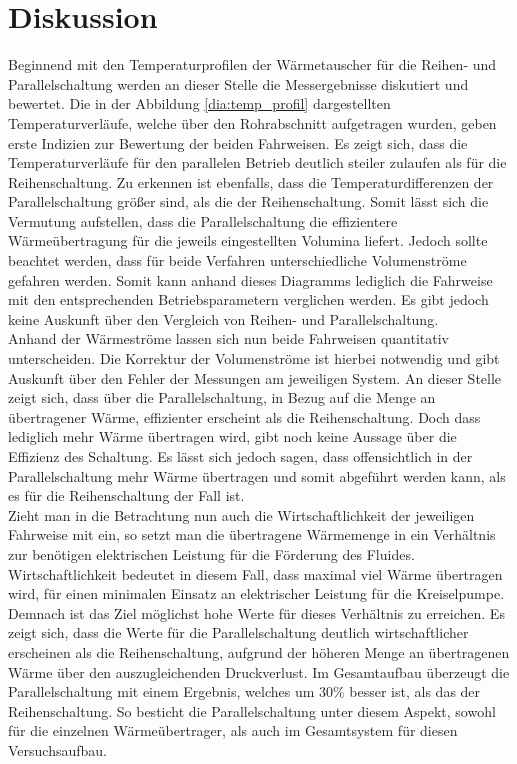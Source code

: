 \newpage
\section{Diskussion}
\label{sec:diskussion}
Beginnend mit den Temperaturprofilen der Wärmetauscher für die Reihen- und Parallelschaltung werden an dieser Stelle die Messergebnisse diskutiert und bewertet. Die in der Abbildung \ref{dia:temp_profil} dargestellten Temperaturverläufe, welche über den Rohrabschnitt aufgetragen wurden,  geben erste Indizien zur Bewertung der beiden Fahrweisen. Es zeigt sich, dass die Temperaturverläufe für den parallelen Betrieb deutlich steiler zulaufen als für die Reihenschaltung. Zu erkennen ist ebenfalls, dass die Temperaturdifferenzen der Parallelschaltung größer sind, als die der Reihenschaltung. Somit lässt sich die Vermutung aufstellen, dass die Parallelschaltung die effizientere Wärmeübertragung für die jeweils eingestellten Volumina liefert. Jedoch sollte beachtet werden, dass für beide Verfahren unterschiedliche Volumenströme gefahren werden. Somit kann anhand dieses Diagramms lediglich die Fahrweise mit den entsprechenden Betriebsparametern verglichen werden. Es gibt jedoch keine Auskunft über den Vergleich von Reihen- und Parallelschaltung.\\

Anhand der Wärmeströme lassen sich nun beide Fahrweisen quantitativ unterscheiden. Die Korrektur der Volumenströme ist hierbei notwendig und gibt Auskunft über den Fehler der Messungen am jeweiligen System. An dieser Stelle zeigt sich, dass über die Parallelschaltung, in Bezug auf die Menge an übertragener Wärme,  effizienter erscheint als die Reihenschaltung. Doch dass lediglich mehr Wärme übertragen wird, gibt noch keine Aussage über die Effizienz des Schaltung. Es lässt sich jedoch sagen, dass offensichtlich in der Parallelschaltung mehr Wärme übertragen und somit abgeführt werden kann, als es für die Reihenschaltung der Fall ist.\\

Zieht man in die Betrachtung nun auch die Wirtschaftlichkeit der jeweiligen Fahrweise mit ein, so setzt man die übertragene Wärmemenge in ein Verhältnis zur benötigen elektrischen Leistung für die Förderung des Fluides. Wirtschaftlichkeit bedeutet in diesem Fall, dass maximal viel Wärme übertragen wird, für einen minimalen Einsatz an elektrischer Leistung für die Kreiselpumpe. Demnach ist das Ziel möglichst hohe Werte für dieses Verhältnis zu erreichen. Es zeigt sich, dass die Werte für die Parallelschaltung deutlich wirtschaftlicher erscheinen als die Reihenschaltung, aufgrund der höheren Menge an übertragenen Wärme über den auszugleichenden Druckverlust. Im Gesamtaufbau überzeugt die Parallelschaltung mit einem Ergebnis, welches um 30\% besser ist, als das der Reihenschaltung.
So besticht die Parallelschaltung unter diesem Aspekt, sowohl für die einzelnen Wärmeübertrager, als auch im Gesamtsystem für diesen Versuchsaufbau. \\

